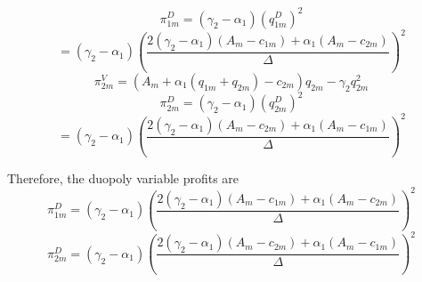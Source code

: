 \documentclass[12pt]{article}
\begin{document}
\[
\pi_{1m}^D
= (\gamma_2-\alpha_1)\left(q_{1m}^D\right)^2
\]
\[
= (\gamma_2-\alpha_1)\left(
\frac{2(\gamma_2-\alpha_1)(A_m - c_{1m}) + \alpha_1 (A_m - c_{2m})}{\Delta}
\right)^2
\]
\[
\pi_{2m}^V = \left(A_m + \alpha_1(q_{1m}+q_{2m}) - c_{2m}\right)q_{2m} - \gamma_2 q_{2m}^2
\]
\[
\pi_{2m}^D
= (\gamma_2-\alpha_1)\left(q_{2m}^D\right)^2
\]
\[
= (\gamma_2-\alpha_1)\left(
\frac{2(\gamma_2-\alpha_1)(A_m - c_{2m}) + \alpha_1 (A_m - c_{1m})}{\Delta}
\right)^2
\]

Therefore, the duopoly variable profits are
\[
\boxed{
\pi_{1m}^D
=
(\gamma_2-\alpha_1)\left(
\frac{2(\gamma_2-\alpha_1)(A_m - c_{1m}) + \alpha_1 (A_m - c_{2m})}{\Delta}
\right)^2
}
\]
\[
\boxed{
\pi_{2m}^D
=
(\gamma_2-\alpha_1)\left(
\frac{2(\gamma_2-\alpha_1)(A_m - c_{2m}) + \alpha_1 (A_m - c_{1m})}{\Delta}
\right)^2
}
\]
\end{document}
